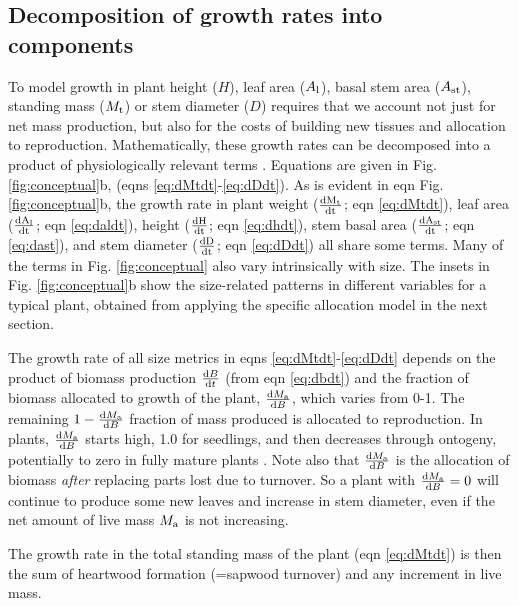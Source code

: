 \documentclass[9pt,twocolumn,twoside,lineno]{pnas-new}
\newcommand{\ud}{\ensuremath{\rm{d}}}
\begin{document}
\subsection{Decomposition of growth rates into components}

\setcounter{equation}{9}

To model growth in plant height ($H$), leaf area ($A_{\rm l}$), basal stem area ($ A_{\rm st}$), standing mass ($M_{\rm t}$) or stem diameter ($D$) requires that we account not just for net mass production, but also for the costs of building new tissues and allocation to reproduction. Mathematically, these growth rates can be decomposed into a product of physiologically relevant terms \citep{Falster-2011, Gibert-2016}. Equations are given in Fig. \ref{fig:conceptual}b, (eqns \ref{eq:dMtdt}-\ref{eq:dDdt}). As is evident in eqn  Fig. \ref{fig:conceptual}b, the growth rate in plant weight ($\frac{\ud M_{\rm t} }{\ud t}$; eqn \ref{eq:dMtdt}), leaf area ($\frac{\ud A_{\rm l}}{\ud t}$; eqn \ref{eq:daldt}), height ($\frac{\ud H}{\ud t}$; eqn \ref{eq:dhdt}), stem basal area ($\frac{\ud  A_{\rm st}}{\ud t}$; eqn \ref{eq:dast}), and stem diameter ($\frac{\ud D}{\ud t}$; eqn \ref{eq:dDdt}) all share some terms. Many of the terms in Fig. \ref{fig:conceptual} also vary intrinsically with size. The insets in Fig. \ref{fig:conceptual}b show the size-related patterns in different variables for a typical plant, obtained from applying the specific allocation model in the next section.

The growth rate of all size metrics in eqns \ref{eq:dMtdt}-\ref{eq:dDdt} depends on the product of biomass production $\frac{{\rm d}B} {{\rm d}t}$ (from eqn \ref{eq:dbdt}) and the fraction of biomass allocated to growth of the plant, $\frac{{\rm d}M_{\rm a}}{{\rm d}B}$, which varies from 0-1. The remaining  $1- \frac{{\rm d}M_{\rm a}}{{\rm d}B}$ fraction of mass produced is allocated to reproduction. In plants, $\frac{{\rm d}M_{\rm a}}{{\rm d}B}$ starts high, 1.0 for seedlings, and then decreases through ontogeny, potentially to zero in fully mature plants \citep{Wenk-2015}. Note also that $\frac{{\rm d}M_{\rm a}}{{\rm d}B}$ is the allocation of biomass \emph{after} replacing parts lost due to turnover. So a plant with $\frac{{\rm d}M_{\rm a}}{{\rm d}B}=0$ will continue to produce some new leaves and increase in stem diameter, even if the net amount of live mass $M_{\rm a}$ is not increasing.

The growth rate in the total standing mass of the plant (eqn \ref{eq:dMtdt}) is then the sum of heartwood formation (=sapwood turnover) and any increment in live mass.
\end{document}
